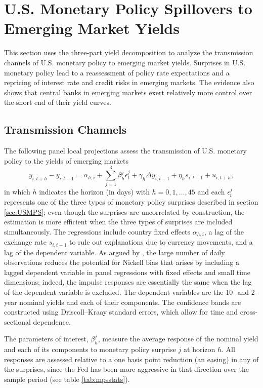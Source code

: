 \documentclass[a4paper, 12pt]{article}
\providecommand{\idxt}{t}
\providecommand{\idxi}{i}
\providecommand{\idxh}{h}
\providecommand{\idxspnlfwd}{\idxi,{\idxt+\idxh}}
\providecommand{\idxspnllag}{\idxi,{\idxt-1}}
\providecommand{\yld}{y}
\providecommand{\fx}{\mathit{s}}
\newcommand{\eqpanelLP}{\yld_{\idxspnlfwd} - \yld_{\idxspnllag} = \alpha_{\idxh,\idxi} + \sum^{3}_{j = 1} \beta^{j}_{\idxh} \epsilon^{j}_{\idxt} + \gamma_{\idxh} \Delta \yld_{\idxspnllag} + \eta_{\idxh} \fx_{\idxspnllag}  + u_{\idxspnlfwd}}
\begin{document}
\section{U.S. Monetary Policy Spillovers to Emerging Market Yields} \label{sec:analysis}
This section uses the three-part yield decomposition to analyze the transmission channels of U.S. monetary policy to emerging market yields. Surprises in U.S. monetary policy lead to a reassessment of policy rate expectations and a repricing of interest rate and credit risks in emerging markets. The evidence also shows that central banks in emerging markets exert relatively more control over the short end of their yield curves. 

\subsection{Transmission Channels} \label{sec:LPs} 
The following panel local projections assess the transmission of U.S. monetary policy to the yields of emerging markets 
\begin{equation} \label{eq:nPanelLP}
\eqpanelLP,
\end{equation}
\noindent in which \(\idxh\) indicates the horizon (in days) with \(\idxh = 0, 1, \ldots, 45\) and each \(\epsilon^{j}_{\idxt}\) represents one of the three types of monetary policy surprises described in section \ref{sec:USMPS}; even though the surprises are uncorrelated by construction, the estimation is more efficient when the three types of surprises are included simultaneously. The regressions include country fixed effects \(\alpha_{\idxh,\idxi}\), a lag of the exchange rate \(\fx_{\idxspnllag}\) to rule out explanations due to currency movements, and a lag of the dependent variable. As argued by \cite{HofmannShimShin:2020}, the large number of daily observations reduces the potential for Nickell bias that arises by including a lagged dependent variable in panel regressions with fixed effects and small time dimensions; indeed, the impulse responses are essentially the same when the lag of the dependent variable is excluded. The dependent variables are the 10- and 2-year nominal yields and each of their components. The confidence bands are constructed using Driscoll--Kraay standard errors, which allow for time and cross-sectional dependence. %

The parameters of interest, \(\beta^{j}_{\idxh}\), measure the average response of the nominal yield and each of its components to monetary policy surprise \(j\) at horizon \(\idxh\). All responses are assessed relative to a one basis point reduction (an easing) in any of the surprises, since the Fed has been more aggressive in that direction over the sample period (see table \ref{tab:mpsstats}). 
\end{document}
